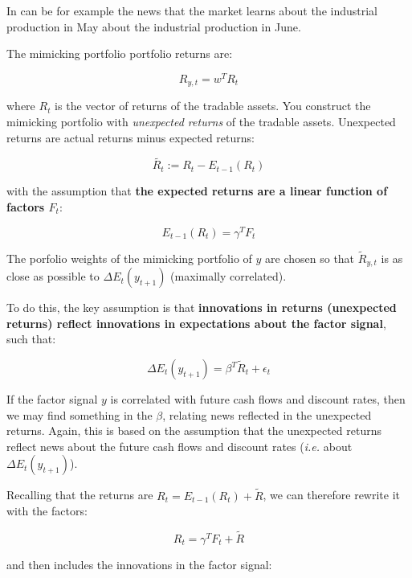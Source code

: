In can be for example the news that the market 
learns about the industrial production in May about 
the industrial production in June.

The mimicking portfolio portfolio returns are:

\begin{equation}
    R_{y, t} = w^T R_t
\end{equation}

where $R_t$ is the vector of returns of the tradable assets.
You construct the mimicking portfolio with 
\textit{unexpected returns} of the tradable assets. Unexpected 
returns are actual returns minus expected returns:

\begin{equation}
    \tilde{R_t} := R_t - E_{t-1}(R_t)
\end{equation}

with the assumption that \textbf{the expected returns are a linear 
function of factors $F_{t}$}:

\begin{equation}
    E_{t-1}(R_t) = \gamma^T F_{t}
\end{equation}


The porfolio weights of the mimicking portfolio of $y$ 
are chosen so that $\tilde{R}_{y,t}$ is as close as possible
to $\Delta E_t(y_{t+1})$ (maximally correlated).

To do this, the key assumption is that 
\textbf{innovations in returns (unexpected returns)
reflect innovations in expectations about 
the factor signal}, such that:

\begin{equation}
    \Delta E_t(y_{t+1}) = \beta^T \tilde{R}_t + \epsilon_t
\end{equation}

If the factor signal $y$ is correlated 
with future cash flows and discount rates,
then we may find something in the $\beta$, relating
news reflected in the unexpected returns. 
Again, this is based on the assumption that 
the unexpected returns reflect news about the
future cash flows and discount rates (\textit{i.e.}
about $\Delta E_t(y_{t+1})$).

Recalling that the returns are $R_t = E_{t-1}(R_t) + \tilde{R}$,
we can therefore rewrite it with the factors:

\begin{equation}
    R_t = \gamma^T F_{t} + \tilde{R}
\end{equation}

and then includes the innovations in the factor signal:

